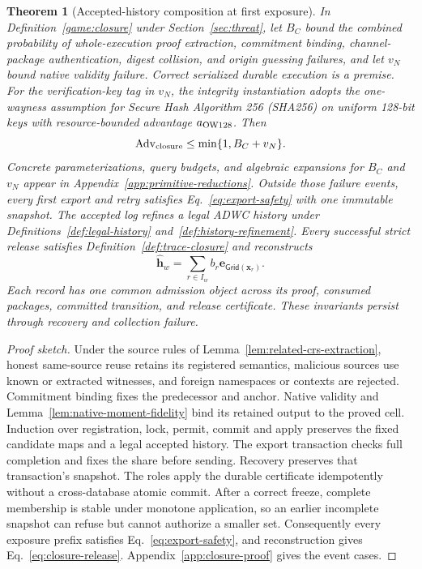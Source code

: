 \documentclass[conference,compsoc]{IEEEtran}
\theoremstyle{definition}
\numberwithin{equation}{section}
\numberwithin{table}{section}
\numberwithin{figure}{section}
\theoremstyle{plain}
\newtheorem{theorem}{Theorem}[section]
\newtheorem{theorem}{Theorem}
\begin{document}
\begin{theorem}[Accepted-history composition at first exposure]
\label{thm:main-semantic-closure}
In Definition~\ref{game:closure} under Section~\ref{sec:threat}, let \(B_C\) bound
the combined probability of whole-execution proof extraction, commitment binding,
channel-package authentication, digest collision, and origin guessing failures,
and let \(v_N\) bound native validity failure. Correct serialized durable execution
is a premise. For the verification-key tag in \(v_N\), the integrity instantiation
adopts the one-wayness assumption for Secure Hash Algorithm 256 (SHA256) on uniform 128-bit keys with resource-bounded
advantage \(a_{\rm OW128}\). Then
\begin{equation}
 \operatorname{Adv}_{\rm closure}\le\min\{1,B_C+v_N\}.
 \label{eq:primitive-bounds}
\end{equation}
Concrete parameterizations, query budgets, and algebraic expansions for \(B_C\)
and \(v_N\) appear in Appendix~\ref{app:primitive-reductions}.
Outside those failure events, every first export and retry satisfies
Eq.~\eqref{eq:export-safety} with one immutable snapshot.
The accepted log refines a legal ADWC history under Definitions~\ref{def:legal-history}
and~\ref{def:history-refinement}. Every successful strict release satisfies
Definition~\ref{def:trace-closure} and reconstructs
\begin{equation}
 \hat{\mathbf h}_w=\sum_{r\in I_w}b_r\mathbf e_{\mathsf{Grid}(\mathbf x_r)}.
 \label{eq:closure-release}
\end{equation}
Each record has one common admission object across its proof, consumed
packages, committed transition, and release certificate. These invariants
persist through recovery and collection failure.
\end{theorem}
\begin{proof}[Proof sketch]
Under the source rules of Lemma~\ref{lem:related-crs-extraction}, honest
same-source reuse retains its registered semantics, malicious sources use known
or extracted witnesses, and foreign namespaces or contexts are rejected.
Commitment binding fixes the predecessor and anchor. Native validity and Lemma~\ref{lem:native-moment-fidelity}
bind its retained output to the proved cell. Induction over registration,
lock, permit, commit and apply preserves the fixed candidate maps and a legal
accepted history. The export transaction checks full completion and fixes
the share before sending. Recovery preserves that transaction's snapshot. The roles apply the durable
certificate idempotently without a cross-database atomic commit. After a
correct freeze, complete membership is stable under monotone application, so
an earlier incomplete snapshot can refuse but cannot authorize a smaller set.
Consequently every exposure prefix satisfies Eq.~\eqref{eq:export-safety},
and reconstruction gives Eq.~\eqref{eq:closure-release}.
Appendix~\ref{app:closure-proof} gives the event cases.
\end{proof}
\end{document}
